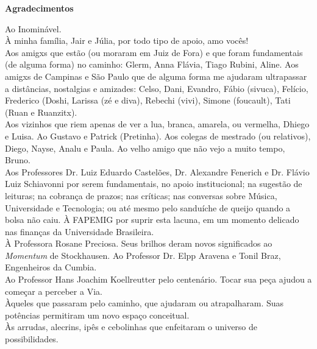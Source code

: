 \newpage
\begin{flushright}
\huge{\textbf{Agradecimentos}}

\small{Ao Inominável.
\ \\
À minha família, Jair e Júlia, por todo tipo de apoio, amo vocês! 
\ \\
Aos amigxs que estão (ou moraram em Juiz de Fora) e que foram fundamentais (de alguma forma) no caminho: Glerm, Anna Flávia, Tiago Rubini, Aline. Aos amigxs de Campinas e São Paulo que de alguma forma me ajudaram ultrapassar a distâncias, nostalgias e amizades: Celso, Dani, Evandro, Fábio (sivuca), Felício, Frederico (Doshi, Larissa (zé e diva), Rebechi (vivi), Simone (foucault), Tati (Ruan e Ruanzitx).
\ \\
Aos vizinhos que riem apenas de ver a lua, branca, amarela, ou vermelha, Dhiego e Luisa. Ao Gustavo e Patrick (Pretinha). Aos colegas de mestrado (ou relativos), Diego, Nayse, Analu e Paula. Ao velho amigo que não vejo a muito tempo, Bruno.
\ \\
Aos Professores Dr. Luiz Eduardo Castelões, Dr. Alexandre Fenerich e Dr. Flávio Luiz Schiavonni por serem fundamentais, no apoio institucional; na sugestão de leituras; na cobrança de prazos; nas críticas; nas conversas sobre Música, Universidade e Tecnologia; ou até mesmo pelo sanduíche de queijo quando a bolsa não caiu. À FAPEMIG por suprir esta lacuna, em um momento delicado nas finanças da Universidade Brasileira.
\ \\
À Professora Rosane Preciosa. Seus brilhos deram novos significados ao \emph{Momentum} de Stockhausen. Ao Professor Dr. Elpp Aravena e Tonil Braz, Engenheiros da Cumbia.
\ \\
Ao Professor Hans Joachim Koellreutter pelo centenário. Tocar sua peça ajudou a começar a perceber a Via.
\ \\
Àqueles que passaram pelo caminho, que ajudaram ou atrapalharam. Suas potências permitiram um novo espaço conceitual.
\ \\
Às arrudas, alecrins, ipês e cebolinhas que enfeitaram o universo de possibilidades.}
\end{flushright}

\vfil \ 

\newpage